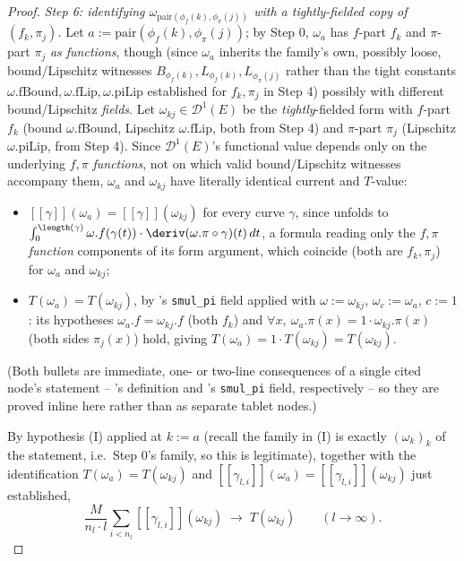 \begin{proof}
  \emph{Step 6: identifying $\omega_{\mathrm{pair}(\phi_f(k),\phi_\pi(j))}$ with a tightly-fielded
  copy of $(f_k,\pi_j)$.} Let $a:=\mathrm{pair}(\phi_f(k),\phi_\pi(j))$; by Step 0,
  $\omega_a$ has $f$-part $f_k$ and $\pi$-part $\pi_j$ \emph{as functions}, though (since $\omega_a$
  inherits the family's own, possibly loose, bound/Lipschitz witnesses $B_{\phi_f(k)},
  L_{\phi_f(k)},L_{\phi_\pi(j)}$ rather than the tight constants $\omega.\mathrm{fBound},
  \omega.\mathrm{fLip},\omega.\mathrm{piLip}$ established for $f_k,\pi_j$ in Step 4) possibly with
  different bound/Lipschitz \emph{fields}. Let $\omega_{kj}\in\mathcal{D}^1(E)$ be the
  \emph{tightly}-fielded form with $f$-part $f_k$ (bound $\omega.\mathrm{fBound}$, Lipschitz
  $\omega.\mathrm{fLip}$, both from Step 4) and $\pi$-part $\pi_j$ (Lipschitz $\omega.\mathrm{piLip}$,
  from Step 4). Since $\mathcal{D}^1(E)$'s functional value depends only on the underlying $f,\pi$
  \emph{functions}, not on which valid bound/Lipschitz witnesses accompany them, $\omega_a$ and
  $\omega_{kj}$ have literally identical current and $T$-value:
  \begin{itemize}
    \item $[[\gamma]](\omega_a)=[[\gamma]](\omega_{kj})$ for every curve $\gamma$, since
       unfolds to $\int_0^{\length(\gamma)}
      \omega.f(\gamma(t))\cdot\deriv(\omega.\pi\circ\gamma)(t)\,dt$, a formula reading only the
      $f,\pi$ \emph{function} components of its form argument, which coincide (both are $f_k,\pi_j$)
      for $\omega_a$ and $\omega_{kj}$;
    \item $T(\omega_a)=T(\omega_{kj})$, by 's \texttt{smul\_pi} field
      applied with $\omega:=\omega_{kj}$, $\omega_c:=\omega_a$, $c:=1$: its hypotheses
      $\omega_a.f=\omega_{kj}.f$ (both $f_k$) and $\forall x,\ \omega_a.\pi(x) =
      1\cdot\omega_{kj}.\pi(x)$ (both sides $\pi_j(x)$) hold, giving $T(\omega_a) = 1\cdot
      T(\omega_{kj}) = T(\omega_{kj})$.
  \end{itemize}
  (Both bullets are immediate, one- or two-line consequences of a single cited node's statement --
  's definition and 's \texttt{smul\_pi} field,
  respectively -- so they are proved inline here rather than as separate tablet nodes.)

  By hypothesis (I) applied at $k:=a$ (recall the family in (I) is exactly $(\omega_k)_{k}$ of the
  statement, i.e.\ Step 0's family, so this is legitimate), together with the identification
  $T(\omega_a)=T(\omega_{kj})$ and $[[\gamma_{l,i}]](\omega_a)=[[\gamma_{l,i}]](\omega_{kj})$ just
  established,
  \[
    \frac{M}{n_l\cdot l}\sum_{i<n_l}[[\gamma_{l,i}]](\omega_{kj})
    \;\longrightarrow\; T(\omega_{kj})
    \qquad(l\to\infty)
    . \tag{6.1}
  \]


\end{proof}
